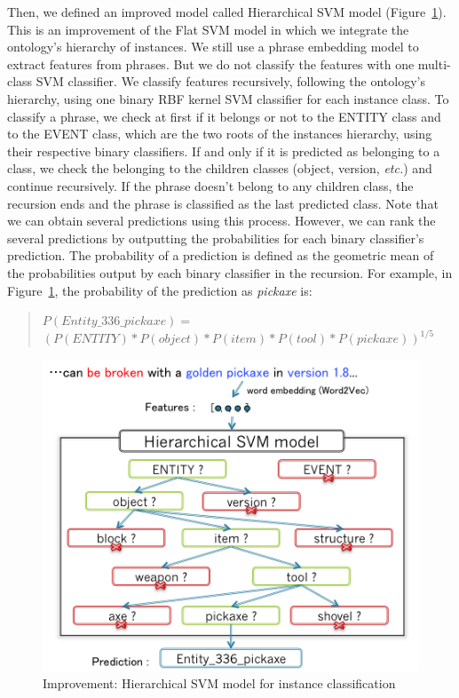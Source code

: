 \documentclass[twocolumn]{article}
\begin{document}
Then, we defined an improved model called Hierarchical SVM model (Figure~\ref{hierarchicalSVMModel}). This is an improvement of the Flat SVM model in which we integrate the ontology's hierarchy of instances. We still use a phrase embedding model to extract features from phrases. But we do not classify the features with one multi-class SVM classifier. We classify features recursively, following the ontology's hierarchy, using one binary RBF kernel SVM classifier for each instance class. To classify a phrase, we check at first if it belongs or not to the ENTITY class and to the EVENT class, which are the two roots of the instances hierarchy, using their respective binary classifiers. If and only if it is predicted as belonging to a class, we check the belonging to the children classes (object, version, \emph{etc.}) and continue recursively. If the phrase doesn't belong to any children class, the recursion ends and the phrase is classified as the last predicted class. Note that we can obtain several predictions using this process. However, we can rank the several predictions by outputting the probabilities for each binary classifier's prediction. The probability of a prediction is defined as the geometric mean of the probabilities output by each binary classifier in the recursion. For example, in Figure~\ref{hierarchicalSVMModel}, the probability of the prediction as \textit{pickaxe} is:

\begin{quote}
$P(Entity\_336\_pickaxe) =$\\
$	(P(ENTITY)*P(object)*P(item)*P(tool)*P(pickaxe))^{1/5}$
\end{quote}

\begin{figure}[t]
   \centering \includegraphics[width=\linewidth]{Figures/Semantic_Parsing/hierarchicalSVMModel.png}
   \caption{\label{hierarchicalSVMModel} Improvement: Hierarchical SVM model for instance classification}
\end{figure}
\end{document}
